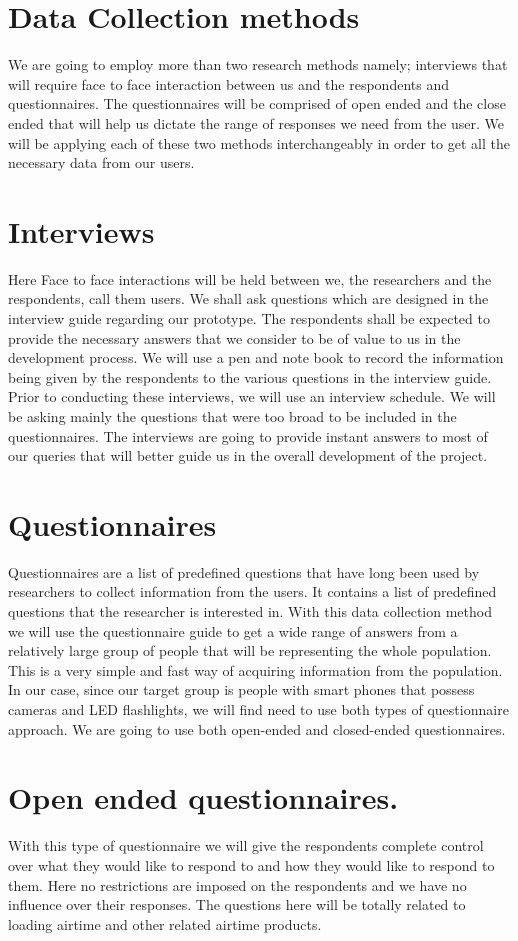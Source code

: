 \documentclass{article}
\begin{document}
\section{Data Collection methods} 
{We are going to employ more than two research methods namely; interviews that will require face to face interaction between us and the respondents and questionnaires. The questionnaires will be comprised of open ended and the close ended that will help us dictate the range of responses we need from the user. We will be applying each of these two methods interchangeably in order to get all the necessary data from our users.} 
\section{Interviews} 
{Here Face to face interactions will be held between we, the researchers and the respondents, call them users. We shall ask questions which are designed in the interview guide regarding our prototype. The respondents shall be expected to provide the necessary answers that we consider to be of value to us in the development process. We will use a pen and note book to record the information being given by the respondents to the various questions in the interview guide. Prior to conducting these interviews, we will use an interview schedule. We will be asking mainly the questions that were too broad to be included in the questionnaires. The interviews are going to provide instant answers to most of our queries that will better guide us in the overall development of the project.}
\section{Questionnaires} 
{Questionnaires are a list of predefined questions that have long been used by researchers to collect information from the users. It contains a list of predefined questions that the researcher is interested in. 
With this data collection method we will use the questionnaire guide to get a wide range of answers from a relatively large group of people that will be representing the whole population. This is a very simple and fast way of acquiring information from the population.  In our case, since our target group is people with smart phones that possess cameras and LED flashlights, we will find need to use both types of questionnaire approach. We are going to use both open-ended and closed-ended questionnaires. } 
\section{Open ended questionnaires.}
{With this type of questionnaire we will give the respondents complete control over what they would like to respond to and how they would like to respond to them. Here no restrictions are imposed on the respondents and we have no influence over their responses. The questions here will be totally related to loading airtime and other related airtime products.} 
\end{document}
